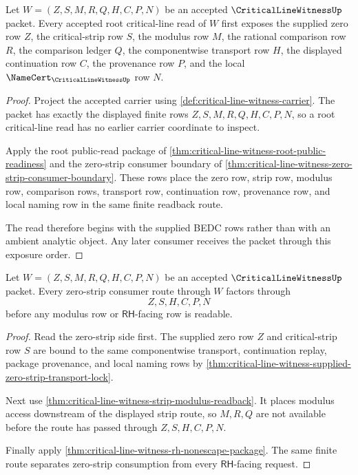\begin{theorem}
\label{thm:critical-line-witness-root-line-row-exposure}
Let $W=(Z,S,M,R,Q,H,C,P,N)$ be an accepted $\CriticalLineWitnessUp$ packet.
Every accepted root critical-line read of $W$ first exposes the supplied zero
row $Z$, the critical-strip row $S$, the modulus row $M$, the rational
comparison row $R$, the comparison ledger $Q$, the componentwise transport row
$H$, the displayed continuation row $C$, the provenance row $P$, and the local
$\NameCert_{\CriticalLineWitnessUp}$ row $N$.
\end{theorem}
\begin{proof}
Project the accepted carrier using \autoref{def:critical-line-witness-carrier}.
The packet has exactly the displayed finite rows $Z,S,M,R,Q,H,C,P,N$, so a root
critical-line read has no earlier carrier coordinate to inspect.

Apply the root public-read package of
\autoref{thm:critical-line-witness-root-public-readiness} and the zero-strip
consumer boundary of
\autoref{thm:critical-line-witness-zero-strip-consumer-boundary}. These rows
place the zero row, strip row, modulus row, comparison rows, transport row,
continuation row, provenance row, and local naming row in the same finite
readback route.

The read therefore begins with the supplied BEDC rows rather than with an
ambient analytic object. Any later consumer receives the packet through this
exposure order.
\end{proof}

\begin{theorem}
\label{thm:critical-line-witness-zero-strip-route-factorization}
Let $W=(Z,S,M,R,Q,H,C,P,N)$ be an accepted $\CriticalLineWitnessUp$ packet.
Every zero-strip consumer route through $W$ factors through
$$
Z,S,H,C,P,N
$$
before any modulus row or $\mathsf{RH}$-facing row is readable.
\end{theorem}
\begin{proof}
Read the zero-strip side first. The supplied zero row $Z$ and critical-strip
row $S$ are bound to the same componentwise transport, continuation replay,
package provenance, and local naming rows by
\autoref{thm:critical-line-witness-supplied-zero-strip-transport-lock}.

Next use \autoref{thm:critical-line-witness-strip-modulus-readback}. It places
modulus access downstream of the displayed strip route, so $M,R,Q$ are not
available before the route has passed through $Z,S,H,C,P,N$.

Finally apply \autoref{thm:critical-line-witness-rh-nonescape-package}. The
same finite route separates zero-strip consumption from every
$\mathsf{RH}$-facing request.
\end{proof}

